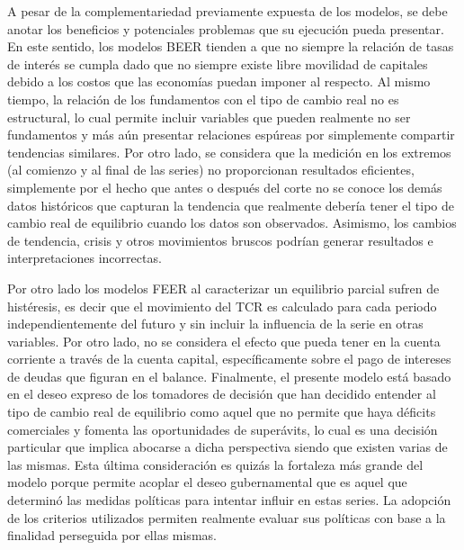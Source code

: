 \documentclass[12pt,letterpaper]{article}
\begin{document}
A pesar de la complementariedad previamente expuesta de los modelos, se debe anotar los beneficios y potenciales problemas que su ejecución pueda presentar. En este sentido, los modelos BEER tienden a que no siempre la relación de tasas de interés se cumpla dado que no siempre existe libre movilidad de capitales debido a los costos que las economías puedan imponer al respecto. Al mismo tiempo, la relación de los fundamentos con el tipo de cambio real no es estructural, lo cual permite incluir variables que pueden realmente no ser fundamentos y más aún presentar relaciones espúreas por simplemente compartir tendencias similares. Por otro lado, se considera que la medición en los extremos (al comienzo y al final de las series) no proporcionan resultados eficientes, simplemente por el hecho que antes o después del corte no se conoce los demás datos históricos que capturan la tendencia que realmente debería tener el tipo de cambio real de equilibrio cuando los datos son observados. Asimismo, los cambios de tendencia, crisis y otros movimientos bruscos podrían generar resultados e interpretaciones incorrectas.

Por otro lado los modelos FEER al caracterizar un equilibrio parcial sufren de histéresis, es decir que el movimiento del TCR es calculado para cada periodo independientemente del futuro y sin incluir la influencia de la serie en otras variables. Por otro lado, no se considera el efecto que pueda tener en la cuenta corriente a través de la cuenta capital, específicamente sobre el pago de intereses de deudas que figuran en el balance. Finalmente, el presente modelo está basado en el deseo expreso de los tomadores de decisión que han decidido entender al tipo de cambio real de equilibrio como aquel que no permite que haya déficits comerciales y fomenta las oportunidades de superávits, lo cual es una decisión particular que implica abocarse a dicha perspectiva siendo que existen varias de las mismas. Esta última consideración es quizás la fortaleza más grande del modelo porque permite acoplar el deseo gubernamental que es aquel que determinó las medidas políticas para intentar influir en estas series. La adopción de los criterios utilizados permiten realmente evaluar sus políticas con base a la finalidad perseguida por ellas mismas.
\end{document}

